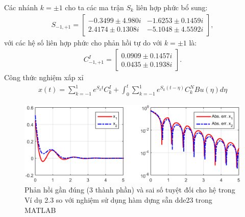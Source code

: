 \documentclass[10pt,notheorems]{beamer}
\theoremstyle{definition}
\theoremstyle{definition}
\theoremstyle{definition}
\begin{document}
\begin{frame}{}
Các nhánh $k=\pm 1$ cho ta các ma trận $S_k$ liên hợp phức bổ sung:
	\begin{align*}
	S_{-1,+1}=\begin{bmatrix}
	-0.3499\pm 4.980i&-1.6253\pm 0.1459i\\
	2.4174\pm 0.1308i&-5.1048\pm 4.5592i
	\end{bmatrix},
	\end{align*}
	với các hệ số liên hợp phức cho phản hồi tự do với $k = \pm 1$ là:
	\begin{align*}
	C^I_{-1,+1}=\begin{bmatrix}
	0.0909\pm 0.1457i\\
	0.0435\pm 0.1938i
	\end{bmatrix}.
	\end{align*}
	Công thức nghiệm xấp xỉ
	\begin{align*}
		x(t) = \sum\limits^1_{k=-1}e^{S_kt}C^I_k+\int^t_0\sum\limits^1_{k=-1}e^{S_k(t-\eta)}C^N_kBu(\eta)d\eta
	\end{align*}
%
\end{frame}

\begin{frame}
	\begin{center}
		\begin{figure}
			\includegraphics[scale=0.4]{hinh/hinh3_new.png}
			\caption{Phản hồi gần đúng (3 thành phần) và sai số tuyệt đối cho hệ trong Ví dụ 2.3
				so với nghiệm sử dụng hàm dựng sẵn dde23 trong MATLAB}
			\label{refhinh3}
		\end{figure}
	\end{center}
\end{frame}


\end{document}

